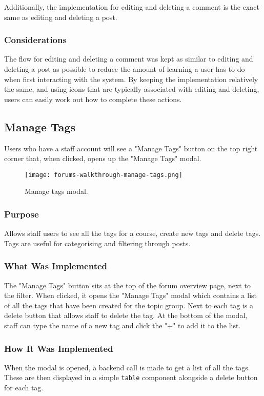Additionally, the implementation for editing and deleting a comment is the exact same as editing and deleting a post.

\subsubsection{Considerations}
The flow for editing and deleting a comment was kept as similar to editing and deleting a post as possible to reduce the amount of learning a user has to do when first interacting with the system.
By keeping the implementation relatively the same, and using icons that are typically associated with editing and deleting, users can easily work out how to complete these actions.

\subsection{Manage Tags}
Users who have a staff account will see a "Manage Tags" button on the top right corner that, when clicked, opens up the "Manage Tags" modal.

\begin{figure}[h!]
    \texttt{[image: forums-walkthrough-manage-tags.png]}
    \centering
    \caption{Manage tags modal.}
\end{figure}

\subsubsection{Purpose}
Allows staff users to see all the tags for a course, create new tags and delete tags.
Tags are useful for categorising and filtering through posts.

\subsubsection{What Was Implemented}
The "Manage Tags" button sits at the top of the forum overview page, next to the filter.
When clicked, it opens the "Manage Tags" modal which contains a list of all the tags that have been created for the topic group.
Next to each tag is a delete button that allows staff to delete the tag.
At the bottom of the modal, staff can type the name of a new tag and click the "+" to add it to the list.

\subsubsection{How It Was Implemented}
When the modal is opened, a backend call is made to get a list of all the tags.
These are then displayed in a simple \texttt{table} component alongside a delete button for each tag.

